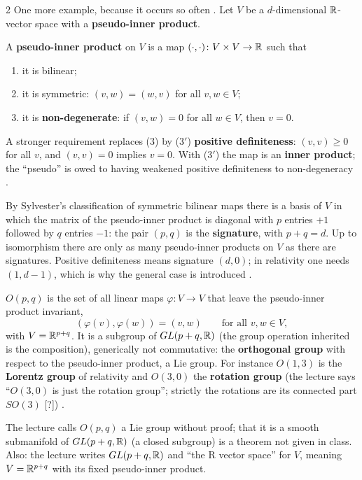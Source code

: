 \begin{paracol}{2}
One more example, because it occurs so often . Let $V$ be a $d$-dimensional $\mathbb{R}$-vector space with a \textbf{pseudo-inner product}.
\begin{definition}\label{def:ll-pseudo}
A \textbf{pseudo-inner product} on $V$ is a map $(\cdot,\cdot)\colon V\times V\to\mathbb{R}$ such that
\begin{enumerate}
  \item[(1)] it is bilinear;
  \item[(2)] it is symmetric: $(v,w)=(w,v)$ for all $v,w\in V$;
  \item[(3)] it is \textbf{non-degenerate}: if $(v,w)=0$ for all $w\in V$, then $v=0$.
\end{enumerate}
A stronger requirement replaces (3) by (3$'$) \textbf{positive definiteness}: $(v,v)\ge0$ for all $v$, and $(v,v)=0$ implies $v=0$. With (3$'$) the map is an \textbf{inner product}; the ``pseudo'' is owed to having weakened positive definiteness to non-degeneracy      .
\end{definition}
By Sylvester's classification of symmetric bilinear maps there is a basis of $V$ in which the matrix of the pseudo-inner product is diagonal with $p$ entries $+1$ followed by $q$ entries $-1$: the pair $(p,q)$ is the \textbf{signature}, with $p+q=d$. Up to isomorphism there are only as many pseudo-inner products on $V$ as there are signatures. Positive definiteness means signature $(d,0)$; in relativity one needs $(1,d-1)$, which is why the general case is introduced    .

\begin{definition}\label{def:ll-opq}
$O(p,q)$ is the set of all linear maps $\varphi\colon V\to V$ that leave the pseudo-inner product invariant,
\[
  (\varphi(v),\varphi(w))=(v,w)\qquad\text{for all }v,w\in V,
\]
with $V=\mathbb{R}^{p+q}$. It is a subgroup of $GL(p+q,\mathbb{R})$ (the group operation inherited is the composition), generically not commutative: the \textbf{orthogonal group} with respect to the pseudo-inner product, a Lie group. For instance $O(1,3)$ is the \textbf{Lorentz group} of relativity and $O(3,0)$ the \textbf{rotation group} (the lecture says ``$O(3,0)$ is just the rotation group''; strictly the rotations are its connected part $SO(3)$ [?])    .
\end{definition}
\begin{coursenote}
The lecture calls $O(p,q)$ a Lie group without proof; that it is a smooth submanifold of $GL(p+q,\mathbb{R})$ (a closed subgroup) is a theorem not given in class. Also: the lecture writes $GL(p+q,\mathbb{R})$ and ``the R vector space'' for $V$, meaning $V=\mathbb{R}^{p+q}$ with its fixed pseudo-inner product. 
\end{coursenote}


\end{paracol}
